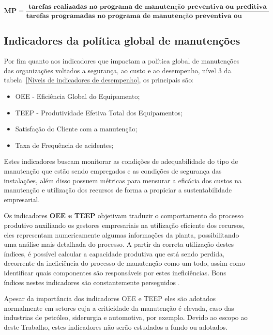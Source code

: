 \begin{equation}
\label{eqn06}
	\mathbf{MP} = \mathbf{\frac{\textrm{tarefas realizadas no programa de manutenção preventiva ou preditiva}}{\textrm{tarefas programadas no programa de manutenção preventiva ou preditiva}}} 
\end{equation}

\subsection{Indicadores da política global de manutenções}
\label{nivel 3}

Por fim quanto aos indicadores que impactam a política global de manutenções das organizações voltados a segurança, ao custo e ao desempenho, nível 3 da tabela~\ref{Niveis de indicadores de desempenho}, os principais são:

\begin{itemize}
	\item OEE - Eficiência Global do Equipamento;
	\item TEEP - Produtividade Efetiva Total dos Equipamentos;
	\item Satisfação do Cliente com a manutenção;	
	\item Taxa de Frequência de acidentes;
	\end{itemize}

Estes indicadores buscam monitorar as condições de adequabilidade do tipo de manutenção que estão sendo empregados e as condições de segurança das instalações, além disso possuem métricas para mensurar a eficácia dos custos na manutenção e utilização dos recursos de forma a propiciar a sustentabilidade empresarial.

Os indicadores \textbf{OEE e TEEP} objetivam traduzir o comportamento do processo produtivo auxiliando os gestores empresariais na utilização eficiente dos recursos, eles representam numericamente algumas informações da planta, possibilitando uma análise mais detalhada do processo. A partir da correta utilização destes índices, é possível calcular a capacidade produtiva que está sendo perdida, decorrente da ineficiência do processo de manutenção como um todo, assim como identificar quais componentes são responsáveis por estes ineficiências. Bons índices nestes indicadores são constantemente perseguidos \cite{de1999analise}.

Apesar da importância dos indicadores OEE e TEEP eles são adotados normalmente em setores cuja a criticidade da manutenção é elevada, caso das industrias de petróleo, siderurgia e automotiva, por exemplo. Devido ao escopo ao deste Trabalho, estes indicadores não serão estudados a fundo ou adotados.

